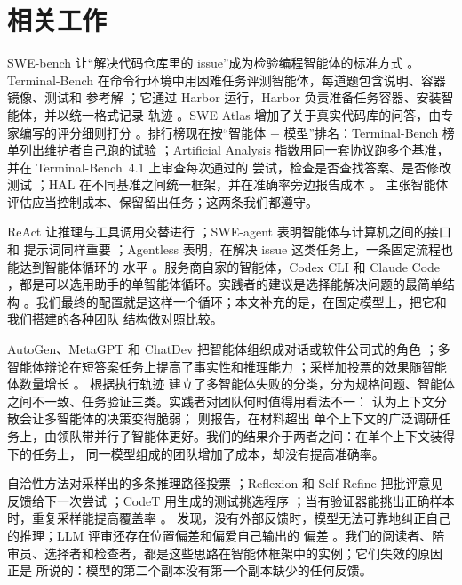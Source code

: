 \section{相关工作}
\label{sec:related}

SWE-bench 让“解决代码仓库里的 issue”成为检验编程智能体的标准方式
\citep{jimenez2024swebench}。Terminal-Bench 在命令行环境中用困难任务评测智能体，每道题包含说明、容器镜像、测试和
参考解 \citep{merrill2026terminalbench}；它通过 Harbor 运行，Harbor 负责准备任务容器、安装智能体，并以统一格式记录
轨迹 \citep{harbor2026}。SWE Atlas 增加了关于真实代码库的问答，由专家编写的评分细则打分
\citep{raghavendra2026sweatlas}。排行榜现在按“智能体 + 模型”排名：Terminal-Bench 榜单列出维护者自己跑的试验
\citep{tbench2026board}；Artificial Analysis 指数用同一套协议跑多个基准，并在 Terminal-Bench~4.1 上审查每次通过的
尝试，检查是否查找答案、是否修改测试 \citep{aa2026coding}；HAL 在不同基准之间统一框架，并在准确率旁边报告成本
\citep{kapoor2026hal}。\citet{kapoor2024agents} 主张智能体评估应当控制成本、保留留出任务；这两条我们都遵守。

ReAct 让推理与工具调用交替进行 \citep{yao2023react}；SWE-agent 表明智能体与计算机之间的接口和
提示词同样重要 \citep{yang2024sweagent}；Agentless 表明，在解决 issue 这类任务上，一条固定流程也能达到智能体循环的
水平 \citep{xia2024agentless}。服务商自家的智能体，Codex CLI \citep{openai2025codex} 和 Claude Code
\citep{anthropic2025claudecode}，都是可以选用助手的单智能体循环。实践者的建议是选择能解决问题的最简单结构
\citep{schluntz2024effective}。我们最终的配置就是这样一个循环；本文补充的是，在固定模型上，把它和我们搭建的各种团队
结构做对照比较。

AutoGen、MetaGPT 和 ChatDev 把智能体组织成对话或软件公司式的角色
\citep{wu2024autogen,hong2024metagpt,qian2024chatdev}；多智能体辩论在短答案任务上提高了事实性和推理能力
\citep{du2024debate}；采样加投票的效果随智能体数量增长 \citep{li2024moreagents}。\citet{cemri2025mast} 根据执行轨迹
建立了多智能体失败的分类，分为规格问题、智能体之间不一致、任务验证三类。实践者对团队何时值得用看法不一：
\citet{yan2025dontbuild} 认为上下文分散会让多智能体的决策变得脆弱；\citet{anthropic2025multiagent} 则报告，在材料超出
单个上下文的广泛调研任务上，由领队带并行子智能体更好。我们的结果介于两者之间：在单个上下文装得下的任务上，
同一模型组成的团队增加了成本，却没有提高准确率。

自洽性方法对采样出的多条推理路径投票 \citep{wang2023selfconsistency}；Reflexion 和
Self-Refine 把批评意见反馈给下一次尝试 \citep{shinn2023reflexion,madaan2023selfrefine}；CodeT 用生成的测试挑选程序
\citep{chen2023codet}；当有验证器能挑出正确样本时，重复采样能提高覆盖率 \citep{brown2024monkeys,snell2025scaling}。
\citet{huang2024cannot} 发现，没有外部反馈时，模型无法可靠地纠正自己的推理；LLM 评审还存在位置偏差和偏爱自己输出的
偏差 \citep{zheng2023judge}。我们的阅读者、陪审员、选择者和检查者，都是这些思路在智能体框架中的实例；它们失效的原因
正是 \citeauthor{huang2024cannot} 所说的：模型的第二个副本没有第一个副本缺少的任何反馈。

